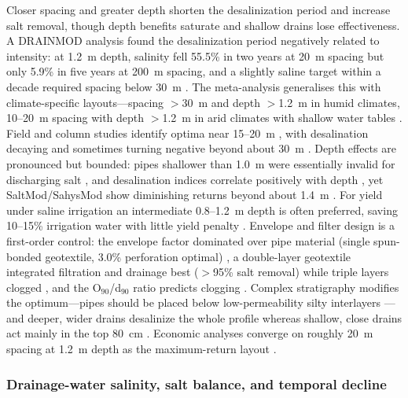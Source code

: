 \documentclass[11pt]{article}
\begin{document}
Closer spacing and greater depth shorten the desalinization period and increase
salt removal, though depth benefits saturate and shallow drains lose
effectiveness. A DRAINMOD analysis found the desalinization period negatively
related to intensity: at 1.2~m depth, salinity fell 55.5\% in two years at 20~m
spacing but only 5.9\% in five years at 200~m spacing, and a slightly saline
target within a decade required spacing below 30~m \parencite{Chen2025}. The
meta-analysis generalises this with climate-specific layouts---spacing $>$30~m
and depth $>$1.2~m in humid climates, 10--20~m spacing with depth $>$1.2~m in
arid climates with shallow water tables \parencite{Yang2025}. Field and column
studies identify optima near 15--20~m
\parencite{Wang2020,Wang2025c,Han2023,Chen2022,Yang2022c}, with desalination
decaying and sometimes turning negative beyond about 30~m \parencite{Zhu2025b}.
Depth effects are pronounced but bounded: pipes shallower than 1.0~m were
essentially invalid for discharging salt \parencite{Qian2021b}, and desalination
indices correlate positively with depth
\parencite{Qian2021b,Tian2023c,Tian2024}, yet SaltMod/SahysMod show diminishing
returns beyond about 1.4~m \parencite{Bahçeci2007,Bahçeci2006}. For yield under
saline irrigation an intermediate 0.8--1.2~m depth is often preferred, saving
10--15\% irrigation water with little yield penalty
\parencite{Feng2017,Feng2019,Muhammad2021}. Envelope and filter design is a
first-order control: the envelope factor dominated over pipe material (single
spun-bonded geotextile, 3.0\% perforation optimal) \parencite{Li2022}, a
double-layer geotextile integrated filtration and drainage best ($>$95\% salt
removal) while triple layers clogged \parencite{Wang2024d}, and the
O$_{90}$/d$_{90}$ ratio predicts clogging \parencite{Elzoghby2021}. Complex
stratigraphy modifies the optimum---pipes should be placed below
low-permeability silty interlayers \parencite{Guo2024b,Tian2024}---and deeper,
wider drains desalinize the whole profile whereas shallow, close drains act
mainly in the top 80~cm \parencite{KAMRA1991}. Economic analyses converge on
roughly 20~m spacing at 1.2~m depth as the maximum-return layout
\parencite{Chen2025}.

\subsubsection{Drainage-water salinity, salt balance, and temporal decline}
\end{document}
